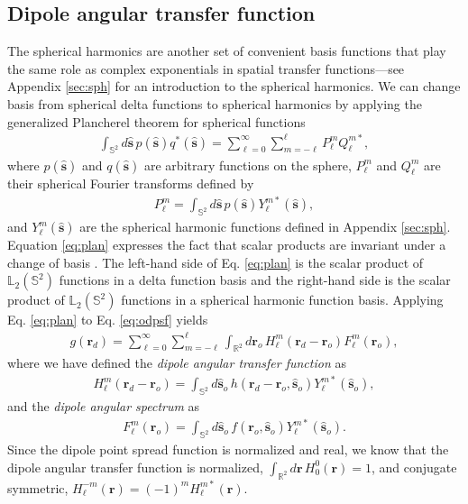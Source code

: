 \documentclass[]{osa-article}
\providecommand{\mb}[1]{\mathbf{#1}}
\providecommand{\ro}{\mathbf{\mathbf{r}}_o}
\providecommand{\so}{\mathbf{\hat{s}}_o}
\providecommand{\rd}{\mathbf{r}_d}
\providecommand{\mh}[1]{\mathbf{\hat{#1}}}
\providecommand{\mbb}[1]{\mathbb{#1}}
\providecommand{\lmsum}{\sum_{\ell=0}^\infty\sum_{m=-\ell}^{\ell}}
\providecommand{\ints}[1]{\int_{\mbb{S}^{#1}}}
\begin{document}
\subsection{Dipole angular transfer function}
The spherical harmonics are another set of convenient basis functions that play
the same role as complex exponentials in spatial transfer functions---see
Appendix \ref{sec:sph} for an introduction to the spherical harmonics. We can
change basis from spherical delta functions to spherical harmonics by applying
the generalized Plancherel theorem for spherical functions
\begin{align}
  \ints{2}d\mh{s}\, p(\mh{s})q^*(\mh{s}) = \lmsum P_\ell^m Q_\ell^{m*}, \label{eq:plan}
\end{align}
where $p(\mh{s})$ and $q(\mh{s})$ are arbitrary functions on the sphere,
$P_\ell^m$ and $Q_\ell^m$ are their spherical Fourier transforms defined by
\begin{align}
  P_\ell^m = \int_{\mbb{S}^2}d\mh{s}\, p(\mh{s})Y_\ell^{m*}(\mh{s}),
\end{align}
and $Y_{\ell}^m(\mh{s})$ are the spherical harmonic functions defined in
Appendix \ref{sec:sph}. Equation \eqref{eq:plan} expresses the fact that scalar
products are invariant under a change of basis \cite[Eq.~3.78]{barrett2004}.
The left-hand side of Eq. \eqref{eq:plan} is the scalar product of
$\mbb{L}_2(\mbb{S}^2)$ functions in a delta function basis and the right-hand
side is the scalar product of $\mbb{L}_2(\mbb{S}^2)$ functions in a spherical
harmonic function basis. Applying Eq. \eqref{eq:plan} to Eq. \eqref{eq:odpsf} yields
\begin{align}
  g(\rd) = \lmsum \int_{\mbb{R}^2}d\ro\, H_\ell^m(\rd - \ro)F_\ell^m(\ro), \label{eq:atf-form}
\end{align}
where we have defined the \textit{dipole angular transfer function} as
\begin{align}
  H_\ell^m(\rd - \ro) = \int_{\mbb{S}^2}d\so\, h(\rd - \ro, \so)Y_{\ell}^{m*}(\so),\label{eq:atf-prep} 
\end{align}
and the \textit{dipole angular spectrum} as
\begin{align}
  F_\ell^m(\ro) = \int_{\mbb{S}^2}d\so\, f(\ro, \so)Y_{\ell}^{m*}(\so).
\end{align}
Since the dipole point spread function is normalized and real, we know
that the dipole angular transfer function is normalized,
$\int_{\mbb{R}^2}d\mb{r}\, H_0^0(\mb{r}) = 1$, and conjugate symmetric,
$H_\ell^{-m}(\mb{r}) = (-1)^mH_\ell^{m*}(\mb{r})$.
\end{document}
